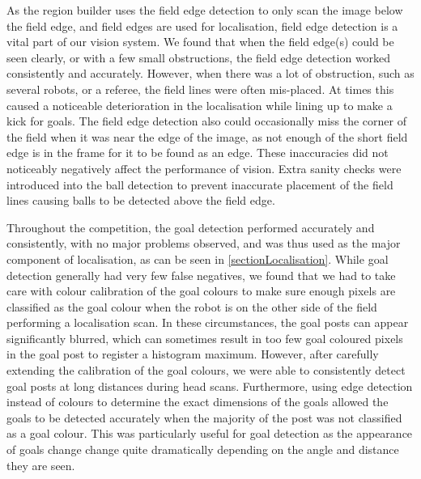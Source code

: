 \documentclass[pdftex,11pt,a4paper]{report}
\begin{document}
As the region builder uses the field edge detection to only scan the image below the field edge, and field edges are used for localisation, field edge detection is a vital part of our vision system. We found that when the field edge(s) could be seen clearly, or with a few small obstructions, the field edge detection worked consistently and accurately. However, when there was a lot of obstruction, such as several robots, or a referee, the field lines were often mis-placed. At times this caused a noticeable deterioration in the localisation while lining up to make a kick for goals. The field edge detection also could occasionally miss the corner of the field when it was near the edge of the image, as not enough of the short field edge is in the frame for it to be found as an edge. These inaccuracies did not noticeably negatively affect the performance of vision. Extra sanity checks were introduced into the ball detection to prevent inaccurate placement of the field lines causing balls to be detected above the field edge.

Throughout the competition, the goal detection performed accurately and consistently, with no major problems observed, and was thus used as the major component of localisation, as can be seen in \autoref{sectionLocalisation}. While goal detection generally had very few false negatives, we found that we had to take care with colour calibration of the goal colours to make sure enough pixels are classified as the goal colour when the robot is on the other side of the field performing a localisation scan. In these circumstances, the goal posts can appear significantly blurred, which can sometimes result in too few goal coloured pixels in the goal post to register a histogram maximum. However, after carefully extending the calibration of the goal colours, we were able to consistently detect goal posts at long distances during head scans. Furthermore, using edge detection instead of colours to determine the exact dimensions of the goals allowed the goals to be detected accurately when the majority of the post was not classified as a goal colour. This was particularly useful for goal detection as the appearance of goals change change quite dramatically depending on the angle and distance they are seen.
\end{document}
